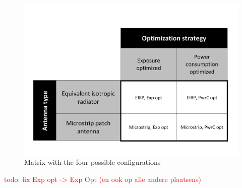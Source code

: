 \begin{figure}[h!]
  \includegraphics[width=\textwidth]{../images/fourCasesMatrix.pdf}
  \caption{Matrix with the four possible configurations}
  \label{fig:fourCasesMatrix}
\end{figure}
\textcolor{red}{todo: fix Exp opt -> Exp Opt (en ook op alle andere plaatsens)}
